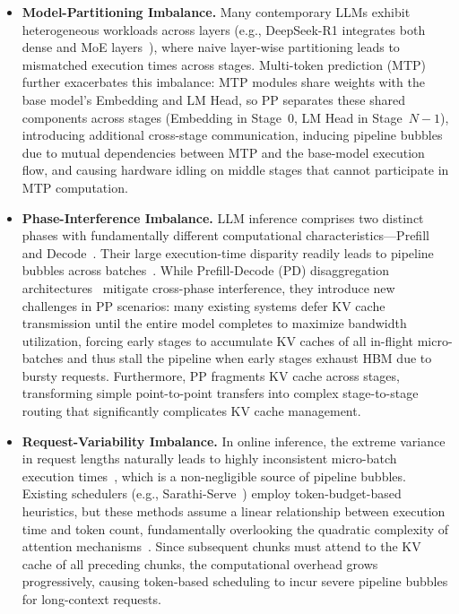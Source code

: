 \documentclass[12pt,a4paper]{article}
\newcommand{\Prefillterm}{Prefill\xspace}
\newcommand{\Decodeterm}{Decode\xspace}
\newcommand{\kvcache}{KV cache\xspace}
\newcommand{\Modelimb}{Model-Partitioning Imbalance\xspace}
\newcommand{\Phaseimb}{Phase-Interference Imbalance\xspace}
\newcommand{\Requestimb}{Request-Variability Imbalance\xspace}
\begin{document}
\begin{itemize}[leftmargin=*]
    \item \textbf{\Modelimb.} Many contemporary LLMs exhibit heterogeneous workloads across layers (e.g., DeepSeek-R1 integrates both dense and MoE layers~\cite{deepseek-r1,deepseekv3}), where naive layer-wise partitioning leads to mismatched execution times across stages.
    Multi-token prediction (MTP)~\cite{eagle,deepseekv3} further exacerbates this imbalance: MTP modules share weights with the base model's Embedding and LM Head, so PP separates these shared components across stages (Embedding in Stage~0, LM Head in Stage~$N{-}1$), introducing additional cross-stage communication, inducing pipeline bubbles due to mutual dependencies between MTP and the base-model execution flow, and causing hardware idling on middle stages that cannot participate in MTP computation.

    \item \textbf{\Phaseimb.} LLM inference comprises two distinct phases with fundamentally different computational characteristics---\Prefillterm and \Decodeterm~\cite{splitwise,distserve}. Their large execution-time disparity readily leads to pipeline bubbles across batches~\cite{dejavu}.
    While Prefill-Decode (PD) disaggregation architectures~\cite{splitwise,distserve,mooncake,dejavu} mitigate cross-phase interference, they introduce new challenges in PP scenarios: many existing systems defer \kvcache transmission until the entire model completes to maximize bandwidth utilization, forcing early stages to accumulate KV caches of all in-flight micro-batches and thus stall the pipeline when early stages exhaust HBM due to bursty requests.
    Furthermore, PP fragments \kvcache across stages, transforming simple point-to-point transfers into complex stage-to-stage routing that significantly complicates \kvcache management.

    \item \textbf{\Requestimb.} In online inference, the extreme variance in request lengths naturally leads to highly inconsistent micro-batch execution times~\cite{sarathi}, which is a non-negligible source of pipeline bubbles.
    Existing schedulers (e.g., Sarathi-Serve~\cite{sarathi}) employ token-budget-based heuristics, but these methods assume a linear relationship between execution time and token count, fundamentally overlooking the quadratic complexity of attention mechanisms~\cite{attention-complexity}.
    Since subsequent chunks must attend to the \kvcache of all preceding chunks, the computational overhead grows progressively, causing token-based scheduling to incur severe pipeline bubbles for long-context requests.
\end{itemize}
\end{document}
